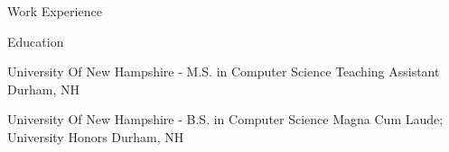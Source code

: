 \documentclass[UKenglish]{resume} %
\begin{document}
\begin{rSection}{Work Experience}
\end{rSection}



\begin{rSection}{ Education }

    \rSubsectionHeading
        {University Of New Hampshire}
        {  -  }
        {\normalfont M.S. in Computer Science}
        {\normalfont Teaching Assistant}
        {Durham, NH}

    \rSubsectionHeading
        {University Of New Hampshire}
        {  -  }
        {\normalfont B.S. in Computer Science}
        {\normalfont Magna Cum Laude; University Honors}
        {Durham, NH}

\end{rSection}
\end{document}
